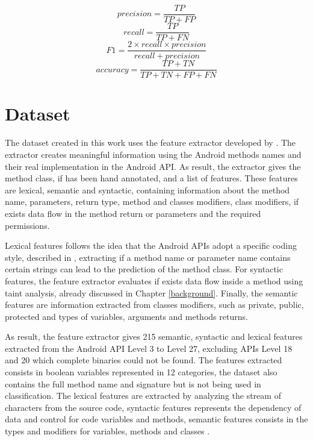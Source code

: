 \begin{multicols}{2}%
    \noindent%
    {%
    \begin{equation} \label{precision} precision = \frac{TP}{TP+FP} \end{equation}%
    \begin{equation} \label{recall} recall = \frac{TP}{TP+FN} \end{equation}%
    }%
    {%
    \begin{equation} \label{f1} F1 = \frac{2 \times recall \times precision}{recall + precision} \end{equation}%
    \begin{equation} \label{accuracy} accuracy = \frac{TP+TN}{TP+TN+FP+FN} \end{equation}%
    }%
\end{multicols}

\section{Dataset}\label{dset_section}

The dataset created in this work uses the feature extractor developed by \cite{rasthofer2014machine}. The extractor creates meaningful information using the Android methods names and their real implementation in the Android API. As result, the extractor gives the method class, if has been hand annotated, and a list of features. These features are lexical, semantic and syntactic, containing information about the method name, parameters, return type, method and classes modifiers, class modifiers, if exists data flow in the method return or parameters and the required permissions.

Lexical features follows the idea that the Android APIs adopt a specific coding style, described in \cite{androidcoderef}, extracting if a method name or parameter name contains certain strings can lead to the prediction of the method class. For syntactic features, the feature extractor evaluates if exists data flow inside a method using taint analysis, already discussed in Chapter \ref{background}. Finally, the semantic features are information extracted from classes modifiers, such as private, public, protected and types of variables, arguments and methods returns.

As result, the feature extractor gives 215 semantic, syntactic and lexical features extracted from the Android API Level 3 to Level 27, excluding APIs Level 18 and 20 which complete binaries could not be found. The features extracted consists in boolean variables represented in 12 categories, the dataset also contains the full method name and signature but is not being used in classification. The lexical features are extracted by analyzing the stream of characters from the source code, syntactic features represents the dependency of data and control for code variables and methods, semantic features consists in the types and modifiers for variables, methods and classes \cite{aho2003compilers}.

